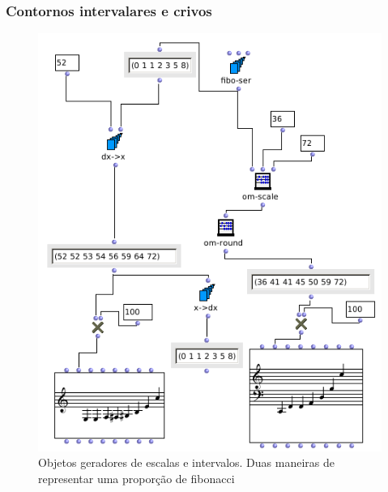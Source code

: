 \documentclass[
	12pt,				%
	openright,			%
	twoside,			%
	a4paper,			%
	english,			%
	french,				%
	spanish,			%
	brazil				%
	]{abntex2}
\begin{document}
\pagebreak
\subsubsection{Contornos intervalares e crivos}

\lipsum[6]

\begin{figure}[!h]
	\caption{\label{fig_grafico}Objetos geradores de escalas e intervalos. Duas maneiras de representar uma proporção de fibonacci }
	\begin{center}
	    \includegraphics[scale=0.6]{OM_settheory/fibonacci.png}
	\end{center}
\end{figure}


\lipsum[7]
\end{document}
